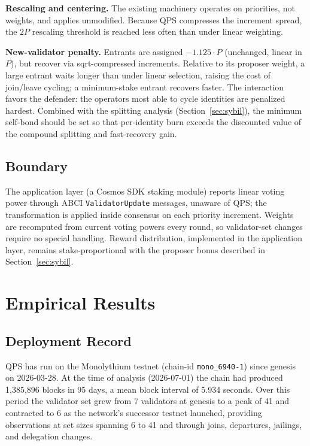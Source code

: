 \documentclass[11pt,a4paper]{article}
\begin{document}
\textbf{Rescaling and centering.} The existing machinery operates on priorities, not weights, and applies unmodified. Because QPS compresses the increment spread, the $2P$ rescaling threshold is reached less often than under linear weighting.

\textbf{New-validator penalty.} Entrants are assigned $-1.125 \cdot P$ (unchanged, linear in $P$), but recover via sqrt-compressed increments. Relative to its proposer weight, a large entrant waits longer than under linear selection, raising the cost of join/leave cycling; a minimum-stake entrant recovers faster. The interaction favors the defender: the operators most able to cycle identities are penalized hardest. Combined with the splitting analysis (Section~\ref{sec:sybil}), the minimum self-bond should be set so that per-identity burn exceeds the discounted value of the compound splitting and fast-recovery gain.

\subsection{Boundary}

The application layer (a Cosmos SDK staking module) reports linear voting power through ABCI \texttt{ValidatorUpdate} messages, unaware of QPS; the transformation is applied inside consensus on each priority increment. Weights are recomputed from current voting powers every round, so validator-set changes require no special handling. Reward distribution, implemented in the application layer, remains stake-proportional with the proposer bonus described in Section~\ref{sec:sybil}.

\section{Empirical Results}
\label{sec:empirical}

\subsection{Deployment Record}

QPS has run on the Monolythium testnet (chain-id \texttt{mono\_6940-1}) since genesis on 2026-03-28. At the time of analysis (2026-07-01) the chain had produced 1{,}385{,}896 blocks in 95 days, a mean block interval of 5.934 seconds. Over this period the validator set grew from 7 validators at genesis to a peak of 41 and contracted to 6 as the network's successor testnet launched, providing observations at set sizes spanning 6 to 41 and through joins, departures, jailings, and delegation changes.
\end{document}
